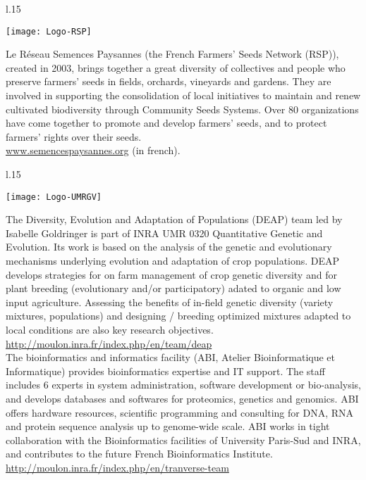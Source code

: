 \begin{wrapfigure}{l}{.15\textwidth}
\begin{center} \vspace{-20pt}
\texttt{[image: Logo-RSP]}
\end{center} \vspace{-20pt}
\end{wrapfigure}
\noindent
Le Réseau Semences Paysannes (the French Farmers' Seeds Network (RSP)), created in 2003, brings together a great diversity of collectives and people who preserve farmers' seeds in fields, orchards, vineyards and gardens. They are involved in supporting the consolidation of local initiatives to maintain and renew cultivated biodiversity through Community Seeds Systems. Over 80 organizations have come together to promote and develop farmers' seeds, and to protect farmers' rights over their seeds. \\
\url{www.semencespaysannes.org} (in french).


\vfill

\begin{wrapfigure}{l}{.15\textwidth}
\begin{center} \vspace{-20pt}
\texttt{[image: Logo-UMRGV]}
\end{center} \vspace{-20pt}
\end{wrapfigure}
\noindent
The Diversity, Evolution and Adaptation of Populations (DEAP) team led by Isabelle Goldringer is part of INRA UMR 0320 Quantitative Genetic and Evolution.
Its work is based on the analysis of the genetic and evolutionary mechanisms underlying evolution and adaptation of crop populations.
DEAP develops strategies for on farm management of crop genetic diversity and
for plant breeding (evolutionary and/or participatory) adated to organic and low input agriculture.
Assessing the benefits of in-field genetic diversity (variety mixtures, populations) and designing
/ breeding optimized mixtures adapted to local conditions are also key research objectives.\\
\url{http://moulon.inra.fr/index.php/en/team/deap} \\
\noindent
The bioinformatics and informatics facility (ABI, Atelier Bioinformatique et Informatique) provides bioinformatics expertise and IT support. The staff includes 6 experts in system administration, software development or bio-analysis, and develops databases and softwares for proteomics, genetics and genomics. ABI offers hardware resources, scientific programming and consulting for DNA, RNA and protein sequence analysis up to genome-wide scale. ABI works in tight collaboration with the Bioinformatics facilities of University Paris-Sud and INRA, and contributes to the future French Bioinformatics Institute. \\
\url{http://moulon.inra.fr/index.php/en/tranverse-team} \\


